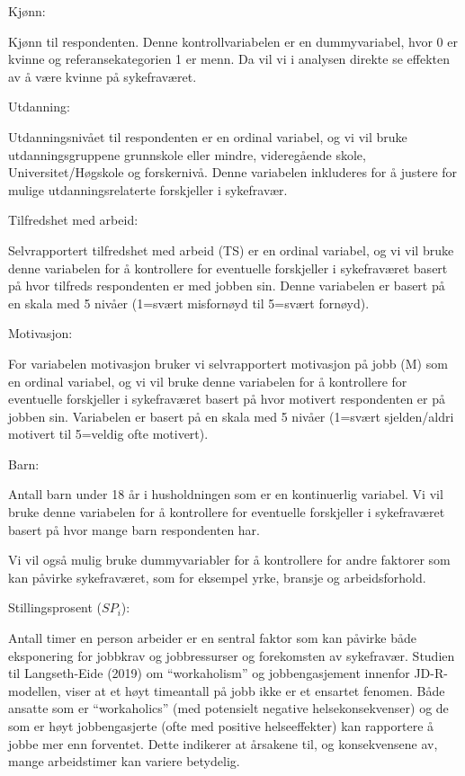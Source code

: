 \documentclass[
  12pt,
  a4paper,
  DIV=11,
  numbers=noendperiod]{scrartcl}
\begin{document}
Kjønn:

Kjønn til respondenten. Denne kontrollvariabelen er en dummyvariabel,
hvor 0 er kvinne og referansekategorien 1 er menn. Da vil vi i analysen
direkte se effekten av å være kvinne på sykefraværet.

Utdanning:

Utdanningsnivået til respondenten er en ordinal variabel, og vi vil
bruke utdanningsgruppene grunnskole eller mindre, videregående skole,
Universitet/Høgskole og forskernivå. Denne variabelen inkluderes for å
justere for mulige utdanningsrelaterte forskjeller i sykefravær.

Tilfredshet med arbeid:

Selvrapportert tilfredshet med arbeid (TS) er en ordinal variabel, og vi
vil bruke denne variabelen for å kontrollere for eventuelle forskjeller
i sykefraværet basert på hvor tilfreds respondenten er med jobben sin.
Denne variabelen er basert på en skala med 5 nivåer (1=svært misfornøyd
til 5=svært fornøyd).

Motivasjon:

For variabelen motivasjon bruker vi selvrapportert motivasjon på jobb
(M) som en ordinal variabel, og vi vil bruke denne variabelen for å
kontrollere for eventuelle forskjeller i sykefraværet basert på hvor
motivert respondenten er på jobben sin. Variabelen er basert på en skala
med 5 nivåer (1=svært sjelden/aldri motivert til 5=veldig ofte
motivert).

Barn:

Antall barn under 18 år i husholdningen som er en kontinuerlig variabel.
Vi vil bruke denne variabelen for å kontrollere for eventuelle
forskjeller i sykefraværet basert på hvor mange barn respondenten har.

Vi vil også mulig bruke dummyvariabler for å kontrollere for andre
faktorer som kan påvirke sykefraværet, som for eksempel yrke, bransje og
arbeidsforhold.

Stillingsprosent (\(SP_i\)):

Antall timer en person arbeider er en sentral faktor som kan påvirke
både eksponering for jobbkrav og jobbressurser og forekomsten av
sykefravær. Studien til Langseth-Eide (2019) om ``workaholism'' og
jobbengasjement innenfor JD-R-modellen, viser at et høyt timeantall på
jobb ikke er et ensartet fenomen. Både ansatte som er ``workaholics''
(med potensielt negative helsekonsekvenser) og de som er høyt
jobbengasjerte (ofte med positive helseeffekter) kan rapportere å jobbe
mer enn forventet. Dette indikerer at årsakene til, og konsekvensene av,
mange arbeidstimer kan variere betydelig.
\end{document}
